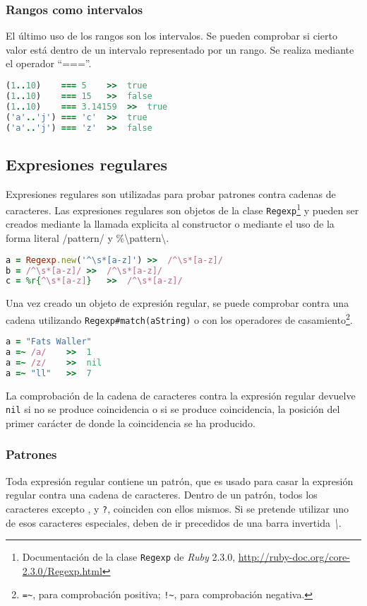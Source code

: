 \subsubsection{Rangos como intervalos}
El último uso de los rangos son los intervalos. Se pueden comprobar si cierto valor está dentro de un intervalo representado por un rango. Se realiza mediante el operador ``===''.

\begin{lstlisting}[language=Ruby]
(1..10)    === 5	>>	true
(1..10)    === 15	>>	false
(1..10)    === 3.14159	>>	true
('a'..'j') === 'c'	>>	true
('a'..'j') === 'z'	>>	false
\end{lstlisting}

\subsection{Expresiones regulares}
Expresiones regulares son utilizadas para probar patrones contra cadenas de caracteres. Las expresiones regulares son objetos de la clase \texttt{Regexp}\footnote{Documentación de la clase \texttt{Regexp} de \textit{Ruby} 2.3.0, \url{http://ruby-doc.org/core-2.3.0/Regexp.html}} y pueden ser creados mediante la llamada explicita al constructor o mediante el uso de la forma literal /pattern/ y \%\textbackslash{}pattern\textbackslash{}.

\begin{lstlisting}[language=Ruby]
a = Regexp.new('^\s*[a-z]')	>>	/^\s*[a-z]/
b = /^\s*[a-z]/	>>	/^\s*[a-z]/
c = %r{^\s*[a-z]}	>>	/^\s*[a-z]/
\end{lstlisting}

Una vez creado un objeto de expresión regular, se puede comprobar contra una cadena utilizando \texttt{Regexp\#match(aString)} o con los operadores de casamiento\footnote{\texttt{=\textasciitilde{}}, para comprobación positiva; \texttt{!\textasciitilde{}}, para comprobación negativa.}.

\begin{lstlisting}[language=Ruby]
a = "Fats Waller"
a =~ /a/	>>	1
a =~ /z/	>>	nil
a =~ "ll"	>>	7 
\end{lstlisting}

La comprobación de la cadena de caracteres contra la expresión regular devuelve \texttt{nil} si no se produce coincidencia o si se produce coincidencia, la posición del primer carácter de donde la coincidencia se ha producido.

\subsubsection{Patrones}
Toda expresión regular contiene un patrón, que es usado para casar la expresión regular contra una cadena de caracteres.
Dentro de un patrón, todos los caracteres excepto , y \texttt{?}, coinciden con ellos mismos. Si se pretende utilizar uno de esos caracteres especiales, deben de ir precedidos de una barra invertida \textit{\textbackslash{}}.

